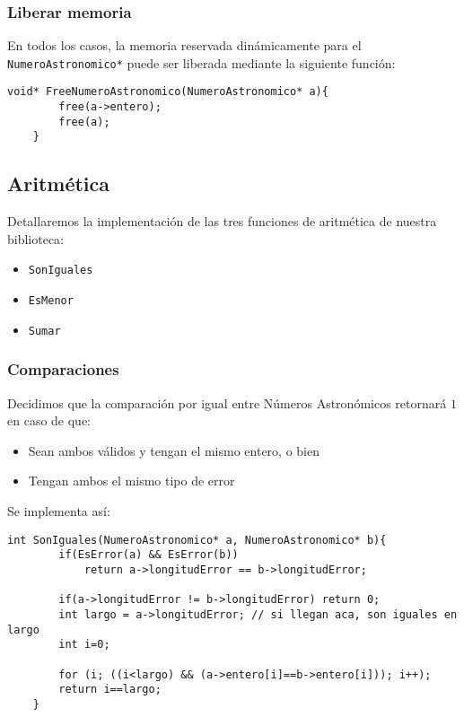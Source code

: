\documentclass[a4paper, 12pt]{article}
\begin{document}
\subsubsection{Liberar memoria} \label{creacion-free}

En todos los casos, la memoria reservada dinámicamente para el \verb|NumeroAstronomico*| puede ser liberada mediante la siguiente función:

\begin{lstlisting}[style=C]
    void* FreeNumeroAstronomico(NumeroAstronomico* a){
        free(a->entero);
        free(a);
    }
\end{lstlisting}

\subsection{Aritmética} \label{aritmetica}
\bigbreak
Detallaremos la implementación de las tres funciones de aritmética de nuestra biblioteca:

\begin{itemize}
    \item \texttt{SonIguales}
    \item \texttt{EsMenor}
    \item \texttt{Sumar}
\end{itemize}

\subsubsection{Comparaciones}\label{aritmetica-comparaciones}
Decidimos que la comparación por igual entre Números Astronómicos retornará $1$ en caso de que:

\begin{itemize}
    \item Sean ambos válidos y tengan el mismo entero, o bien
    \item Tengan ambos el mismo tipo de error
\end{itemize}

Se implementa así:

\begin{lstlisting}[style=C]
    int SonIguales(NumeroAstronomico* a, NumeroAstronomico* b){
        if(EsError(a) && EsError(b))
            return a->longitudError == b->longitudError;
            
        if(a->longitudError != b->longitudError) return 0;
        int largo = a->longitudError; // si llegan aca, son iguales en largo
        int i=0;
    
        for (i; ((i<largo) && (a->entero[i]==b->entero[i])); i++);
        return i==largo;
    }
\end{lstlisting}
\end{document}
